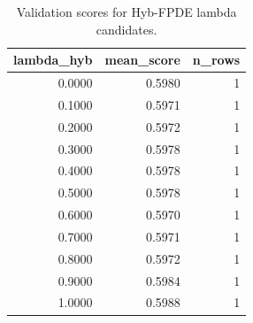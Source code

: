 \begin{table}[t]
\caption{Validation scores for Hyb-FPDE lambda candidates.}
\label{tab:lambda_distribution_computed}
\centering
\begin{tabular}{rrr}
\toprule
lambda\_hyb & mean\_score & n\_rows \\
\midrule
0.0000 & 0.5980 & 1 \\
0.1000 & 0.5971 & 1 \\
0.2000 & 0.5972 & 1 \\
0.3000 & 0.5978 & 1 \\
0.4000 & 0.5978 & 1 \\
0.5000 & 0.5978 & 1 \\
0.6000 & 0.5970 & 1 \\
0.7000 & 0.5971 & 1 \\
0.8000 & 0.5972 & 1 \\
0.9000 & 0.5984 & 1 \\
1.0000 & 0.5988 & 1 \\
\bottomrule
\end{tabular}

\end{table}
